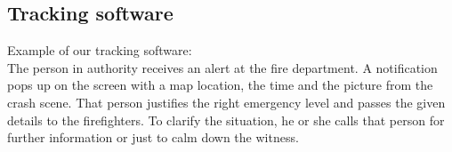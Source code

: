 \subsection{Tracking software}
Example of our tracking software:
\\[8pt]
The person in authority receives an alert at the fire department. A notification
pops up on the screen with a map location, the time and the picture from the
crash scene. That person justifies the right emergency level and passes the
given details to the firefighters. To clarify the situation, he or she calls
that person for further information or just to calm down the witness.



